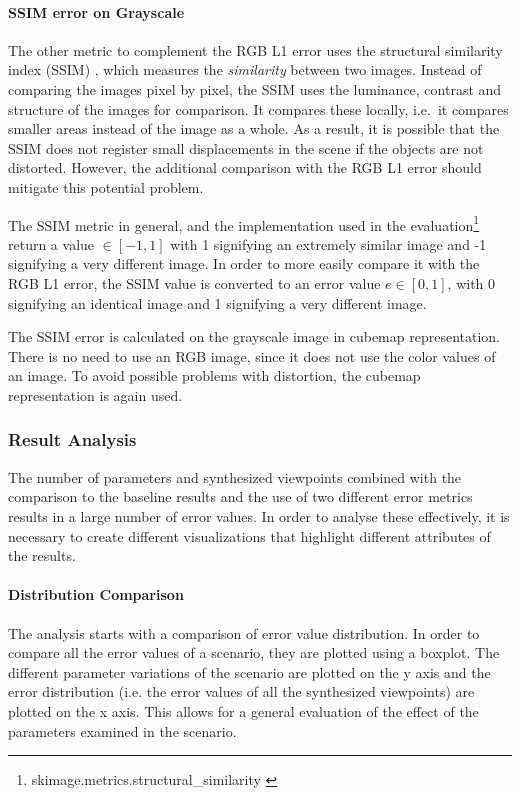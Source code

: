 \paragraph{SSIM error on Grayscale}
The other metric to complement the RGB L1 error uses the structural similarity index (SSIM) \cite{ssim}, which measures the \emph{similarity} between two images. Instead of comparing the images pixel by pixel, the SSIM uses the luminance, contrast and structure of the images for comparison. It compares these locally, i.e.\ it compares smaller areas instead of the image as a whole. As a result, it is possible that the SSIM does not register small displacements in the scene if the objects are not distorted. However, the additional comparison with the RGB L1 error should mitigate this potential problem.

The SSIM metric in general, and the implementation used in the evaluation\footnote{skimage.metrics.structural\_similarity \cite{skimage}} return a value $\in [-1, 1]$ with 1 signifying an extremely similar image and -1 signifying a very different image. In order to more easily compare it with the RGB L1 error, the SSIM value is converted to an error value $ e \in [0,1]$, with 0 signifying an identical image and 1 signifying a very different image.

The SSIM error is calculated on the grayscale image in cubemap representation. There is no need to use an RGB image, since it does not use the color values of an image. To avoid possible problems with distortion, the cubemap representation is again used.

\subsubsection{Result Analysis}
The number of parameters and synthesized viewpoints combined with the comparison to the baseline results and the use of two different error metrics results in a large number of error values. In order to analyse these effectively, it is necessary to create different visualizations that highlight different attributes of the results.

\paragraph{Distribution Comparison}
The analysis starts with a comparison of error value distribution. In order to compare all the error values of a scenario, they are plotted using a boxplot. The different parameter variations of the scenario are plotted on the y axis and the error distribution (i.e. the error values of all the synthesized viewpoints) are plotted on the x axis. This allows for a general evaluation of the effect of the parameters examined in the scenario.

